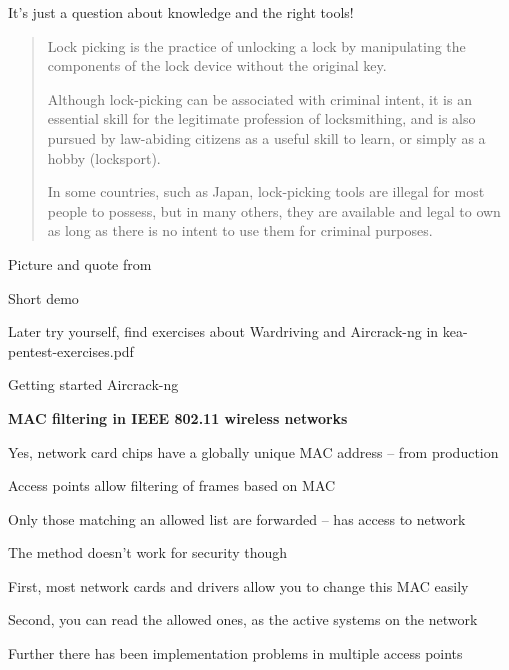 \documentclass[Screen16to9,17pt]{foils}
\begin{document}
\begin{list2}
\item It's just a question about knowledge and the right tools!
\end{list2}



\begin{quote}\footnotesize
Lock picking is the practice of unlocking a lock by manipulating the components of the lock device without the original key.

Although lock-picking can be associated with criminal intent, it is an essential skill for the legitimate profession of locksmithing, and is also pursued by law-abiding citizens as a useful skill to learn, or simply as a hobby (locksport).

In some countries, such as Japan, lock-picking tools are illegal for most people to possess, but in many others, they are available and legal to own as long as there is no intent to use them for criminal purposes.
\end{quote}
Picture  and quote from 





\begin{list2}
\item Short demo
\item Later try yourself, find exercises about Wardriving and Aircrack-ng in kea-pentest-exercises.pdf
\item Getting started Aircrack-ng 
\end{list2}



{\bf MAC filtering in IEEE 802.11 wireless networks}
\begin{list2}
\item Yes, network card chips have a globally unique MAC address -- from production
\item Access points allow filtering of frames based on MAC
\item Only those matching an allowed list are forwarded -- has access to network
\item The method doesn't work for security though \smiley
\item First, most network cards and drivers allow you to change this MAC easily
\item Second, you can read the allowed ones, as the active systems on the network
\item Further there has been implementation problems in multiple access points
\end{list2}
\end{document}

